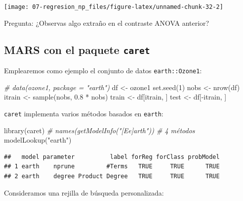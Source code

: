 \documentclass[
]{book}
\newenvironment{Shaded}{\begin{snugshade}}{\end{snugshade}}
\newcommand{\CommentTok}[1]{\textcolor[rgb]{0.56,0.35,0.01}{\textit{#1}}}
\newcommand{\DecValTok}[1]{\textcolor[rgb]{0.00,0.00,0.81}{#1}}
\newcommand{\FloatTok}[1]{\textcolor[rgb]{0.00,0.00,0.81}{#1}}
\newcommand{\FunctionTok}[1]{\textcolor[rgb]{0.00,0.00,0.00}{#1}}
\newcommand{\NormalTok}[1]{#1}
\newcommand{\OtherTok}[1]{\textcolor[rgb]{0.56,0.35,0.01}{#1}}
\newcommand{\SpecialCharTok}[1]{\textcolor[rgb]{0.00,0.00,0.00}{#1}}
\newcommand{\StringTok}[1]{\textcolor[rgb]{0.31,0.60,0.02}{#1}}
\theoremstyle{break}
\theoremstyle{definition}
\theoremstyle{definition}
\theoremstyle{definition}
\theoremstyle{definition}
\theoremstyle{remark}
\begin{document}
\begin{center}\texttt{[image: 07-regresion\_np\_files/figure-latex/unnamed-chunk-32-2]} \end{center}

Pregunta: ¿Observas algo extraño en el contraste ANOVA anterior?

\hypertarget{mars-con-el-paquete-caret}{%
\subsection{\texorpdfstring{MARS con el paquete \texttt{caret}}{MARS con el paquete caret}}\label{mars-con-el-paquete-caret}}

Emplearemos como ejemplo el conjunto de datos \texttt{earth::Ozone1}:

\begin{Shaded}
\begin{Highlighting}[]
\CommentTok{\# data(ozone1, package = "earth")}
\NormalTok{df }\OtherTok{\textless{}{-}}\NormalTok{ ozone1  }
\FunctionTok{set.seed}\NormalTok{(}\DecValTok{1}\NormalTok{)}
\NormalTok{nobs }\OtherTok{\textless{}{-}} \FunctionTok{nrow}\NormalTok{(df)}
\NormalTok{itrain }\OtherTok{\textless{}{-}} \FunctionTok{sample}\NormalTok{(nobs, }\FloatTok{0.8} \SpecialCharTok{*}\NormalTok{ nobs)}
\NormalTok{train }\OtherTok{\textless{}{-}}\NormalTok{ df[itrain, ]}
\NormalTok{test }\OtherTok{\textless{}{-}}\NormalTok{ df[}\SpecialCharTok{{-}}\NormalTok{itrain, ]}
\end{Highlighting}
\end{Shaded}

\texttt{caret} implementa varios métodos basados en \texttt{earth}:

\begin{Shaded}
\begin{Highlighting}[]
\FunctionTok{library}\NormalTok{(caret)}
\CommentTok{\# names(getModelInfo("[Ee]arth")) \# 4 métodos}
\FunctionTok{modelLookup}\NormalTok{(}\StringTok{"earth"}\NormalTok{)}
\end{Highlighting}
\end{Shaded}

\begin{verbatim}
##   model parameter          label forReg forClass probModel
## 1 earth    nprune         #Terms   TRUE     TRUE      TRUE
## 2 earth    degree Product Degree   TRUE     TRUE      TRUE
\end{verbatim}

Consideramos una rejilla de búsqueda personalizada:
\end{document}
